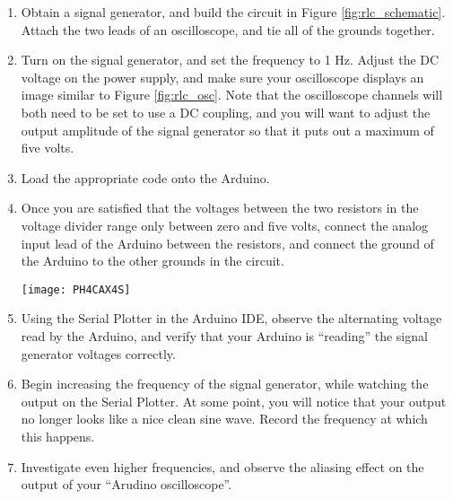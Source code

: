 {\begin{enumerate}
\item Obtain a signal generator, and build the circuit in Figure 
	\ref{fig:rlc_schematic}. Attach the two leads of an oscilloscope, and
	tie all of the grounds together.
\item Turn on the signal generator, and set the frequency to 1 Hz. Adjust the
	DC voltage on the power supply, and make sure your oscilloscope 
		displays an image similar to Figure \ref{fig:rlc_osc}. Note
		that the oscilloscope channels will both need to be set to use
		a DC coupling, and you will want to adjust the output amplitude
		of the signal generator so that it puts out a maximum of
		five volts.
\item Load the appropriate code onto the Arduino.
\item Once you are satisfied that the voltages between the two resistors in 
	the voltage divider range only between zero and five volts, connect
		the analog input lead of the Arduino between the resistors, 
		and connect the ground of the Arduino to the other grounds
		in the circuit.
\begin{center}
\texttt{[image: PH4CAX4S]}
\end{center}
\item Using the Serial Plotter in the Arduino IDE, observe the alternating
	voltage read by the Arduino, and verify that your Arduino is 
		``reading'' the signal generator voltages correctly.
\item Begin increasing the frequency of the signal generator, while watching
	the output on the Serial Plotter. At some point, you will notice that
		your output no longer looks like a nice clean sine wave. 
		Record the frequency at which this happens.
\item Investigate even higher frequencies, and observe the aliasing effect on 
	the output of your ``Arudino oscilloscope''.
\end{enumerate}
}
